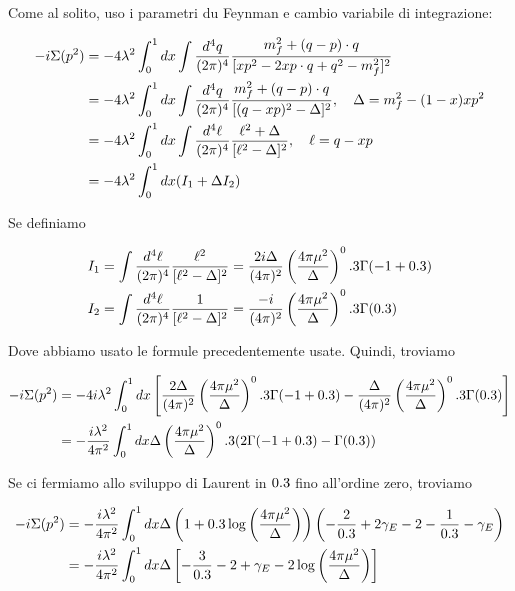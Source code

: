 \documentclass[11pt]{report}
\begin{document}
Come al solito, uso i parametri du Feynman e cambio variabile di integrazione: 

\begin{align}
    -i\Sigma(p^2) &= -4\lambda^2 \int_0^1 dx \int  \frac{d^4q}{(2\pi)^4}\frac{m_f^2 + (q-p)\cdot q}{[xp^2 - 2xp\cdot q + q^2 - m^2_f]^2} \notag \\ 
    &= -4\lambda^2 \int_0^1 dx \int \frac{d^4q}{(2\pi)^4}\frac{m^2_f + (q-p)\cdot q}{[(q-xp)^2 - \Delta]^2}, \quad \Delta = m^2_f - (1-x)xp^2 \notag \\ 
    &= -4\lambda^2 \int_0^1 dx \int \frac{d^4\ell}{(2\pi)^4}\frac{\ell^2 + \Delta}{[\ell^2 - \Delta]^2}, \quad \ell = q-xp \notag \\ 
    &= -4\lambda^2 \int_0^1dx (I_1 + \Delta I_2)
\end{align}

Se definiamo 

\begin{align}
    &I_1 = \int \frac{d^4\ell}{(2\pi)^4}\frac{\ell^2}{[\ell^2 - \Delta]^2} = \frac{2i\Delta}{(4\pi)^2}\left(\frac{4\pi\mu^2}{\Delta} \right)^0.3\Gamma(-1+0.3) \notag \\ 
    &I_2 = \int \frac{d^4\ell}{(2\pi)^4}\frac{1}{[\ell^2 - \Delta]^2} = \frac{-i}{(4\pi)^2}\left(\frac{4\pi\mu^2}{\Delta} \right)^0.3 \Gamma(0.3)
\end{align}

Dove abbiamo usato le formule precedentemente usate. Quindi, troviamo 

\begin{align}
    -i\Sigma(p^2) &= -4i\lambda^2 \int_0^1 dx \left[\frac{2\Delta}{(4\pi)^2}\left(\frac{4\pi\mu^2}{\Delta}\right)^0.3\Gamma(-1+0.3) - \frac{\Delta}{(4\pi)^2}\left( \frac{4\pi\mu^2}{\Delta}\right)^0.3 \Gamma(0.3) \right] \notag \\ 
    &= -\frac{i\lambda^2}{4\pi^2}\int_0^1 dx \Delta \left(\frac{4\pi\mu^2}{\Delta} \right)^0.3(2\Gamma(-1+0.3) - \Gamma(0.3))
\end{align}

Se ci fermiamo allo sviluppo di Laurent in \(0.3\) fino all'ordine zero, troviamo 

\begin{align}
    -i\Sigma(p^2) &= -\frac{i\lambda^2}{4\pi^2}\int_0^1 dx \Delta \left(1+0.3\log\left(\frac{4\pi\mu^2}{\Delta}\right) \right)\left(-\frac{2}{0.3} + 2\gamma_E - 2 - \frac{1}{0.3} - \gamma_E \right) \notag \\ 
    &= -\frac{i\lambda^2}{4\pi^2}\int_0^1 dx \Delta \left[-\frac{3}{0.3} - 2+\gamma_E -2\log\left(\frac{4\pi\mu^2}{\Delta} \right)\right]
\end{align}
\end{document}
